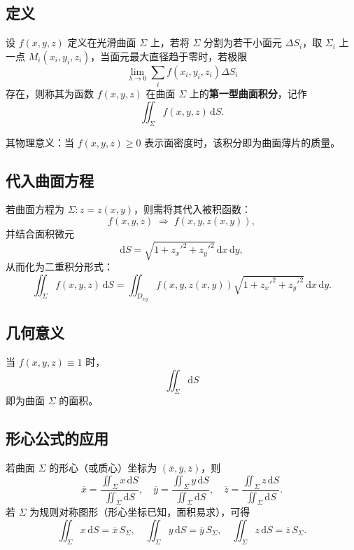 \subsection{定义}

设 $f(x,y,z)$ 定义在光滑曲面 $\Sigma$ 上，若将 $\Sigma$ 分割为若干小面元 $\Delta S_i$，取 $\Sigma_i$ 上一点 $M_i(x_i,y_i,z_i)$，当面元最大直径趋于零时，若极限
\[
      \lim_{\lambda \to 0} \sum_i f(x_i,y_i,z_i)\Delta S_i
\]
存在，则称其为函数 $f(x,y,z)$ 在曲面 $\Sigma$ 上的\textbf{第一型曲面积分}，记作
\[
      \iint_{\Sigma} f(x,y,z)\, \mathrm{d}S.
\]

其物理意义：当 $f(x,y,z)\ge0$ 表示面密度时，该积分即为曲面薄片的质量。


\subsection{代入曲面方程}

若曲面方程为 $\Sigma: z = z(x,y)$，则需将其代入被积函数：
\[
      f(x,y,z) \;\Rightarrow\; f(x,y,z(x,y)),
\]
并结合面积微元
\[
      \mathrm{d}S = \sqrt{1 + z_x'^2 + z_y'^2}\, \mathrm{d}x\, \mathrm{d}y,
\]
从而化为二重积分形式：
\[
      \iint_{\Sigma} f(x,y,z)\, \mathrm{d}S
      = \iint_{D_{xy}} f(x,y,z(x,y)) \sqrt{1 + z_x'^2 + z_y'^2}\, \mathrm{d}x\, \mathrm{d}y.
\]


\subsection{几何意义}

当 $f(x,y,z)\equiv1$ 时，
\[
      \iint_{\Sigma} \mathrm{d}S
\]
即为曲面 $\Sigma$ 的面积。


\subsection{形心公式的应用}

若曲面 $\Sigma$ 的形心（或质心）坐标为 $(\overline{x},\overline{y},\overline{z})$，则
\[
      \overline{x} = \frac{\iint_{\Sigma} x\, \mathrm{d}S}{\iint_{\Sigma} \mathrm{d}S}, \quad
      \overline{y} = \frac{\iint_{\Sigma} y\, \mathrm{d}S}{\iint_{\Sigma} \mathrm{d}S}, \quad
      \overline{z} = \frac{\iint_{\Sigma} z\, \mathrm{d}S}{\iint_{\Sigma} \mathrm{d}S}.
\]
若 $\Sigma$ 为规则对称图形（形心坐标已知，面积易求），可得
\[
      \iint_{\Sigma} x\, \mathrm{d}S = \overline{x} \, S_{\Sigma}, \quad
      \iint_{\Sigma} y\, \mathrm{d}S = \overline{y} \, S_{\Sigma}, \quad
      \iint_{\Sigma} z\, \mathrm{d}S = \overline{z} \, S_{\Sigma}.
\]


